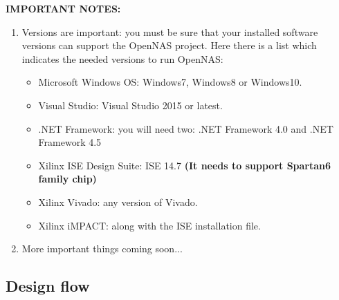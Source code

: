 \textbf{IMPORTANT NOTES:}
\begin{enumerate}
\item Versions are important: you must be sure that your installed software versions can support the OpenNAS project. Here there is a list which indicates the needed versions to run OpenNAS:
    \begin{itemize}
        \item Microsoft Windows OS: Windows7, Windows8 or Windows10.
        \item Visual Studio: Visual Studio 2015 or latest.
        \item .NET Framework: you will need two: .NET Framework 4.0 and .NET Framework 4.5
        \item Xilinx ISE Design Suite: ISE 14.7 \textbf{(It needs to support Spartan6 family chip)}
        \item Xilinx Vivado: any version of Vivado.
        \item Xilinx iMPACT: along with the ISE installation file.
    \end{itemize}
\item More important things coming soon...
\end{enumerate}



\subsection{Design flow}




